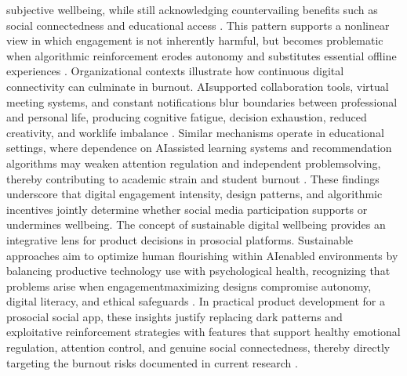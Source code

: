 \documentclass{article}
\begin{document}
subjective well\-being, while still acknowledging countervailing benefits such as social connectedness and educational access \parencites[6]{2404919}. This pattern supports a nonlinear view in which engagement is not inherently harmful, but becomes problematic when algorithmic reinforcement erodes autonomy and substitutes essential offline experiences \parencites[6]{2404919}[6]{9300898}. Organizational contexts illustrate how continuous digital connectivity can culminate in burnout. AI\-supported collaboration tools, virtual meeting systems, and constant notifications blur boundaries between professional and personal life, producing cognitive fatigue, decision exhaustion, reduced creativity, and work\-life imbalance \parencites[6]{2404919}. Similar mechanisms operate in educational settings, where dependence on AI\-assisted learning systems and recommendation algorithms may weaken attention regulation and independent problem\-solving, thereby contributing to academic strain and student burnout \parencites[16]{2404919}. These findings underscore that digital engagement intensity, design patterns, and algorithmic incentives jointly determine whether social media participation supports or undermines well\-being. The concept of sustainable digital well\-being provides an integrative lens for product decisions in pro\-social platforms. Sustainable approaches aim to optimize human flourishing within AI\-enabled environments by balancing productive technology use with psychological health, recognizing that problems arise when engagement\-maximizing designs compromise autonomy, digital literacy, and ethical safeguards \parencites[6]{2404919}[12]{2404919}. In practical product development for a pro\-social social app, these insights justify replacing dark patterns and exploitative reinforcement strategies with features that support healthy emotional regulation, attention control, and genuine social connectedness, thereby directly targeting the burnout risks documented in current research \parencites[6]{2404919}[6]{9300898}[11]{6644697}.
\end{document}

